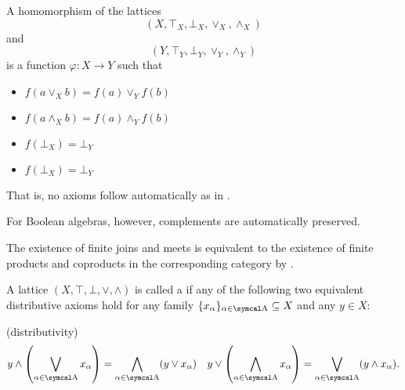 \begin{proposition}\label{thm:lattice_homomorphism}
  A homomorphism of the lattices
  \begin{equation*}
    (X, \top_X, \bot_X, \vee_X, \wedge_X)
  \end{equation*}
  and
  \begin{equation*}
    (Y, \top_Y, \bot_Y, \vee_Y, \wedge_Y)
  \end{equation*}
  is a function \( \varphi: X \to Y \) such that
  \begin{itemize}
    \item \( f(a \vee_X b) = f(a) \vee_Y f(b) \)
    \item \( f(a \wedge_X b) = f(a) \wedge_Y f(b) \)
    \item \( f(\bot_X) = \bot_Y \)
    \item \( f(\bot_X) = \bot_Y \)
  \end{itemize}

  That is, no axioms follow automatically as in .

  For Boolean algebras, however, complements are automatically preserved.
\end{proposition}

\begin{remark}\label{def:lattice_categorical_product}
  The existence of finite joins and meets is equivalent to the existence of finite products and coproducts in the corresponding category by .
\end{remark}

\begin{definition}\label{def:distributive_lattice}\cite{nLab:distributive_lattice}
  A lattice \( (X, \top, \bot, \vee, \wedge) \) is called a  if any of the following two equivalent distributive axioms hold for any family \( \{ x_\al \}_{\al \in \CA} \subseteq X \) and any \( y \in X \):
  \begin{description}
    (distributivity)
    \begin{align*}
      y \wedge \left( \bigvee_{\al \in \CA} x_\al \right) = \bigwedge_{\al \in \CA} (y \vee x_\al)
      &&
      y \vee \left( \bigwedge_{\al \in \CA} x_\al \right) = \bigvee_{\al \in \CA} (y \wedge x_\al).
    \end{align*}
  \end{description}
\end{definition}

